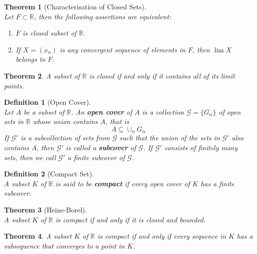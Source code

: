 \documentclass[12pt]{article}
\newtheorem{definition}{Definition}[section]
\newtheorem{theorem}{Theorem}[section]
\theoremstyle{definition}
\begin{document}
\begin{theorem}[Characterisation of Closed Sets]
\hfill\\\normalfont Let $F\subset \mathbb{R}$, then the following assertions are equivalent:
\begin{enumerate}
	\item $F$ is closed subset of $\mathbb{R}$.
	\item If $X=(x_n)$ is any convergent sequence of elements in $F$, then $\lim X$ belongs to $F$.
\end{enumerate}
\end{theorem}
\begin{theorem}\normalfont A subset of $\mathbb{R}$ is closed if and only if it contains all of its limit points.\end{theorem}
\begin{definition}[Open Cover]
\hfill\\\normalfont Let $A$ be a subset of $\mathbb{R}$. An \textbf{open cover} of $A$ is a collection $\mathcal{G}=\{G_\alpha\}$ of open sets in $\mathbb{R}$ whose union contains $A$, that is
\[
A\subseteq \cup_{\alpha}G_{\alpha}
\]
If $\mathcal{G}'$ is a subcollection of sets from $\mathcal{G}$ such that the union of the sets in $\mathcal{G}'$ also contains $A$, then $\mathcal{G}'$ is called a \textbf{subcover} of $\mathcal{G}$. If $\mathcal{G}'$ consists of finitely many sets, then we call $\mathcal{G}'$ a finite subcover of $\mathcal{G}$.
\end{definition}
\begin{definition}[Compact Set]
\hfill\\\normalfont A subset $K$ of $\mathbb{R}$ is said to be \textbf{compact} if every open cover of $K$ has a finite subcover.
\end{definition}
\begin{theorem}[Heine-Borel]
\hfill\\\normalfont A subset $K$ of $\mathbb{R}$ is compact if and only if it is closed and bounded.
\end{theorem}
\begin{theorem}\normalfont A subset $K$ of $\mathbb{R}$ is compact if and only if every sequence in $K$ has a subsequence that converges to a point in $K$.
\end{theorem}
\end{document}
